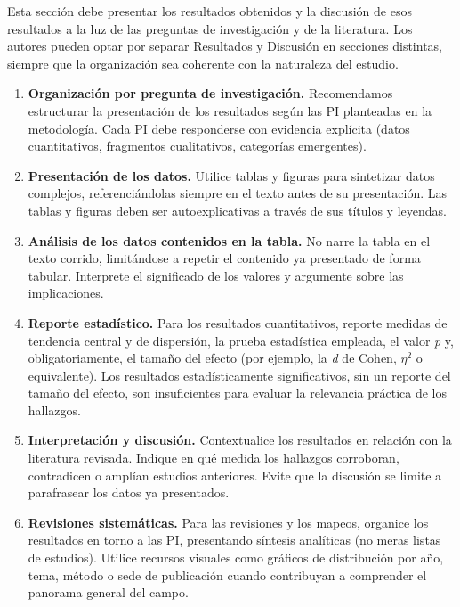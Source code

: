 \documentclass[spanish]{rbie2026}%
\begin{document}
Esta sección debe presentar los resultados obtenidos y la discusión de esos resultados a la luz de las preguntas de investigación y de la literatura. Los autores pueden optar por separar Resultados y Discusión en secciones distintas, siempre que la organización sea coherente con la naturaleza del estudio.

\begin{enumerate}
  \item \textbf{Organización por pregunta de investigación.} Recomendamos estructurar la presentación de los resultados según las PI planteadas en la metodología. Cada PI debe responderse con evidencia explícita (datos cuantitativos, fragmentos cualitativos, categorías emergentes).

  \item \textbf{Presentación de los datos.} Utilice tablas y figuras para sintetizar datos complejos, referenciándolas siempre en el texto antes de su presentación. Las tablas y figuras deben ser autoexplicativas a través de sus títulos y leyendas.

  \item \textbf{Análisis de los datos contenidos en la tabla.} No narre la tabla en el texto corrido, limitándose a repetir el contenido ya presentado de forma tabular. Interprete el significado de los valores y argumente sobre las implicaciones.

  \item \textbf{Reporte estadístico.} Para los resultados cuantitativos, reporte medidas de tendencia central y de dispersión, la prueba estadística empleada, el valor \textit{p} y, obligatoriamente, el tamaño del efecto (por ejemplo, la \textit{d} de Cohen, \(\eta^2\) o equivalente). Los resultados estadísticamente significativos, sin un reporte del tamaño del efecto, son insuficientes para evaluar la relevancia práctica de los hallazgos.

  \item \textbf{Interpretación y discusión.} Contextualice los resultados en relación con la literatura revisada. Indique en qué medida los hallazgos corroboran, contradicen o amplían estudios anteriores. Evite que la discusión se limite a parafrasear los datos ya presentados.

  \item \textbf{Revisiones sistemáticas.} Para las revisiones y los mapeos, organice los resultados en torno a las PI, presentando síntesis analíticas (no meras listas de estudios). Utilice recursos visuales como gráficos de distribución por año, tema, método o sede de publicación cuando contribuyan a comprender el panorama general del campo.
\end{enumerate}
\end{document}
